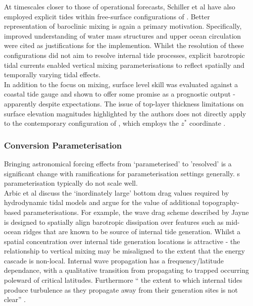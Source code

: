At timescales closer to those of operational forecasts, Schiller et al have also employed explicit tides within free-surface configurations of \MOM{}.  
Better representation of baroclinic mixing is again a primary motivation. 
Specifically, improved understanding of water mass structures \cite{Schiller:2004fv} and upper ocean circulation \cite{Schiller:2007gk} were cited as justifications for the implemention.  
Whilst the resolution of these configurations did not aim to resolve internal tide processes, explicit barotropic tidal currents enabled vertical mixing parameterisations to reflect spatially and temporally varying tidal effects.\\
In addition to the focus on mixing, surface level skill was evaluated against a coastal tide gauge and shown to offer some promise as a prognostic output \citep[Fig 2]{Schiller:2007gk} - apparently despite expectations.   
The issue of top-layer thickness limitations on surface elevation magnitudes highlighted by the authors does not directly apply to the contemporary \BL{} configuration of \MOM{}, which employs the $z^*$ coordinate \citep{Brassington:2012wm}.\\


\subsubsection{Conversion Parameterisation}

Bringing astronomical forcing effects from `parameterised' to 'resolved' is a significant change with ramifications for parameterisation settings generally. \OGCM{}s parameterisation typically do not scale well.\\



Arbic et al \cite{Arbic:2004wz} discuss the `inordinately large' bottom drag values required by hydrodynamic tidal models and argue for the value of additional topography-based parameterisations.   
For example, the wave drag scheme described by Jayne \cite{Jayne:2001tr} is designed to spatially align barotropic dissipation over features such as mid-ocean ridges that are known to be source of internal tide generation.  Whilst a spatial concentration over internal tide generation locations is attractive - the relationship to vertical mixing may be misaligned to the extent that the energy cascade is non-local.  Internal wave propagation has a frequency/latitude dependance, with a qualitative transition from propagating to trapped occurring poleward of critical latitudes.  Furthermore `` the extent to which internal tides produce turbulence as they propagate away from their generation sites is not clear'' \citep[pp812]{Jayne:2001tr}.\\



